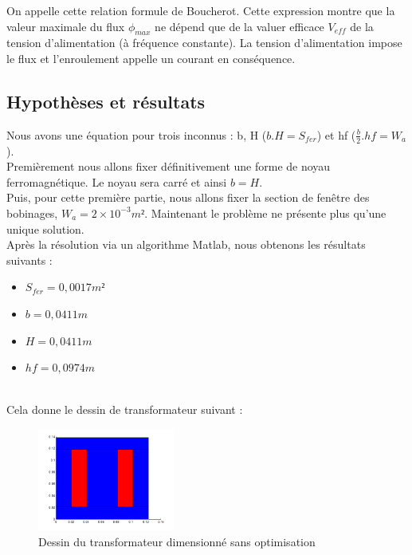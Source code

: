 On appelle cette relation formule de Boucherot. Cette expression montre que la valeur maximale du flux $\phi_{max}$ ne dépend que de la valuer efficace $V_{eff} $ de la tension d'alimentation (à fréquence constante). La tension d'alimentation impose le flux et l'enroulement appelle un courant en conséquence. 


\subsection{Hypothèses et résultats}
Nous avons une équation pour trois inconnus : b, H ($b.H = S_{fer}$) et hf ($\frac{b}{2}.hf = W_a$).\\
Premièrement nous allons fixer définitivement une forme de noyau ferromagnétique. Le noyau sera carré et ainsi $b = H$.\\
Puis, pour cette première partie, nous allons fixer la section de fenêtre des bobinages, $W_a = 2\times{}10^{-3} m²$.
Maintenant le problème ne présente plus qu'une unique solution.\\

\newpage
Après la résolution via un algorithme Matlab, nous obtenons les résultats suivants : \\
\begin{itemize}
\item $S_{fer} = 0,0017 m² $
\item $b = 0,0411 m $
\item $H = 0,0411 m $
\item $hf = 0,0974 m $
\end{itemize}~\\

Cela donne le dessin de transformateur suivant :
\begin{figure}[h]
	\begin{center}
	\includegraphics[width=0.4\textwidth]{images/TP1_transfo_carre}
	\caption{Dessin du transformateur dimensionné sans optimisation}\label{img:dessinTransfoCarre}
	\end{center}
\end{figure}
\FloatBarrier 

